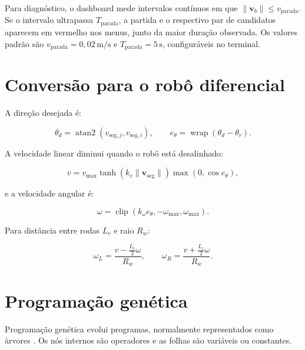 \documentclass[12pt,a4paper]{article}
\newcommand{\vect}[1]{\boldsymbol{#1}}
\DeclareMathOperator{\clip}{clip}
\DeclareMathOperator{\wrap}{wrap}
\begin{document}
Para diagn\'ostico, o dashboard mede intervalos cont\'inuos em que
$\|\vect{v}_b\|\leq v_{\mathrm{parada}}$. Se o intervalo ultrapassa
$T_{\mathrm{parada}}$, a partida e o respectivo par de candidatos aparecem em
vermelho nos menus, junto da maior dura\c{c}\~ao observada. Os valores padr\~ao
s\~ao $v_{\mathrm{parada}}=0{,}02\,\mathrm{m/s}$ e
$T_{\mathrm{parada}}=5\,\mathrm{s}$, configur\'aveis no terminal.

\section{Convers\~ao para o rob\^o diferencial}

A dire\c{c}\~ao desejada \'e:

\begin{equation}
  \theta_d=\operatorname{atan2}(v_{\mathrm{seg},j},v_{\mathrm{seg},i}),\qquad
  e_\theta=\wrap(\theta_d-\theta_r).
\end{equation}

A velocidade linear diminui quando o rob\^o est\'a desalinhado:

\begin{equation}
  v=v_{\max}\tanh(k_v\|\vect{v}_{\mathrm{seg}}\|)\max(0,\cos e_\theta),
\end{equation}

e a velocidade angular \'e:

\begin{equation}
  \omega=\clip(k_\omega e_\theta,-\omega_{\max},\omega_{\max}).
\end{equation}

Para dist\^ancia entre rodas $L_r$ e raio $R_w$:

\begin{equation}
  \omega_L=\frac{v-\frac{L_r}{2}\omega}{R_w},\qquad
  \omega_R=\frac{v+\frac{L_r}{2}\omega}{R_w}.
\end{equation}

\section{Programa\c{c}\~ao gen\'etica}

Programa\c{c}\~ao gen\'etica evolui programas, normalmente representados como \`arvores \cite{poli2008,koza1992}. Os n\'os internos s\~ao operadores e as folhas s\~ao vari\'aveis ou constantes.
\end{document}
